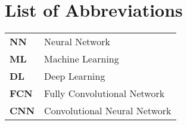 \chapter*{\centering List of Abbreviations}

\begin{spacing}{1.5}
\setlength{\parskip}{0.3in}

\begin{table}[ht]
\centering
\begin{tabular}{ll}
\textbf{NN} & Neural Network \\
\textbf{ML} & Machine Learning \\
\textbf{DL} & Deep Learning \\
\textbf{FCN} & Fully Convolutional Network \\
\textbf{CNN} & Convolutional Neural Network \\
\end{tabular}%
\end{table}

\end{spacing}
\newpage
